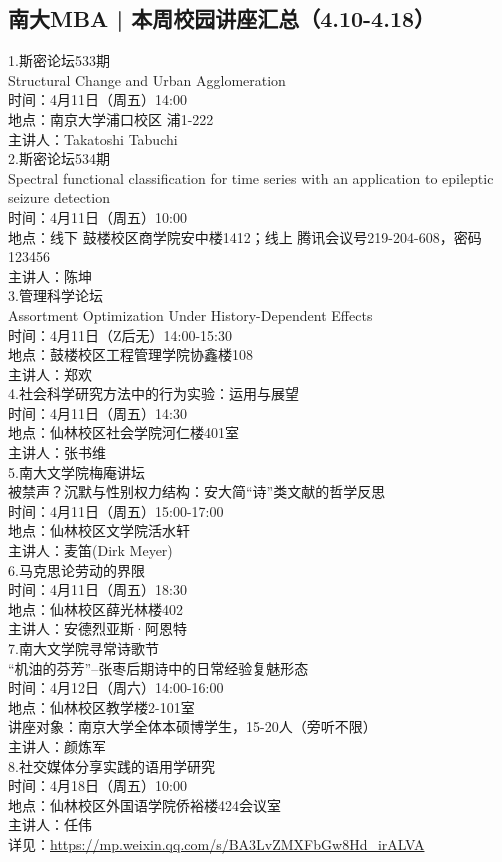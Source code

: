 \documentclass[letterpaper, 12pt]{article}
\begin{document}
\begin{multicols}{2}
\subsection{南大MBA | 本周校园讲座汇总（4.10-4.18）}
1.斯密论坛533期
\\Structural Change and Urban Agglomeration
\\时间：4月11日（周五）14:00
\\地点：南京大学浦口校区 浦1-222
\\主讲人：Takatoshi Tabuchi
\\2.斯密论坛534期
\\Spectral functional classification for time series with an application to epileptic seizure detection
\\时间：4月11日（周五）10:00
\\地点：线下 鼓楼校区商学院安中楼1412；线上 腾讯会议号219-204-608，密码123456
\\主讲人：陈坤
\\3.管理科学论坛
\\Assortment Optimization Under History-Dependent Effects
\\时间：4月11日（Z后无）14:00-15:30
\\地点：鼓楼校区工程管理学院协鑫楼108
\\主讲人：郑欢
\\4.社会科学研究方法中的行为实验：运用与展望
\\时间：4月11日（周五）14:30
\\地点：仙林校区社会学院河仁楼401室
\\主讲人：张书维
\\5.南大文学院梅庵讲坛
\\被禁声？沉默与性别权力结构：安大简“诗”类文献的哲学反思
\\时间：4月11日（周五）15:00-17:00
\\地点：仙林校区文学院活水轩
\\主讲人：麦笛(Dirk Meyer)
\\6.马克思论劳动的界限
\\时间：4月11日（周五）18:30
\\地点：仙林校区薛光林楼402
\\主讲人：安德烈亚斯·阿恩特
\\7.南大文学院寻常诗歌节
\\“机油的芬芳”--张枣后期诗中的日常经验复魅形态
\\时间：4月12日（周六）14:00-16:00
\\地点：仙林校区教学楼2-101室
\\讲座对象：南京大学全体本硕博学生，15-20人（旁听不限）
\\主讲人：颜炼军
\\8.社交媒体分享实践的语用学研究
\\时间：4月18日（周五）10:00
\\地点：仙林校区外国语学院侨裕楼424会议室
\\主讲人：任伟
\\详见：\url{https://mp.weixin.qq.com/s/BA3LvZMXFbGw8Hd_irALVA}



\end{multicols}
\end{document}
